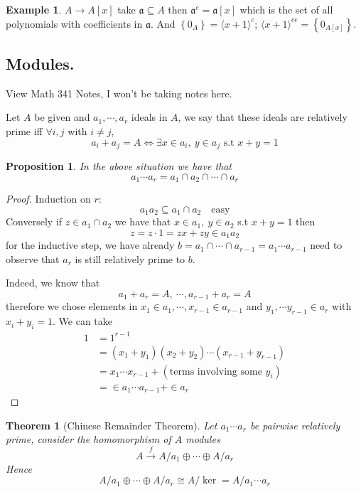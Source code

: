 \documentclass[11pt,a4paper]{article}
\theoremstyle{definition}
\newtheorem{example}[definition]{Example}
\theoremstyle{plain}
\newtheorem{theorem}[definition]{Theorem}
\newtheorem{proposition}[definition]{Proposition}
\theoremstyle{remark}
\renewcommand{\set}[1]{\left\{ #1 \right\}}
\newcommand{\angles}[1]{\langle #1 \rangle}
\begin{document}
\begin{example}
    $A \to A[x]$ take $\mathfrak{a} \subseteq A$ then 
    $\mathfrak{a}^e = \mathfrak{a}[x]$ which is the set of all polynomials with coefficients in $\mathfrak{a}$. And 
    $\set{0_A} = \angles{x + 1}^c$; $\angles{x+1}^{ce} = \set{0_{A[x]}}$. 
\end{example}

\subsection{Modules.}
View Math 341 Notes, I won't be taking notes here. 

Let $A$ be given and $a_1, \cdots, a_r$ ideals in $A$, we say that these ideals are relatively prime iff 
$\forall i, j$ with $i \neq j$, 
$$a_i + a_j = A \iff \exists x \in a_i, \ y \in a_j \text{ s.t } x + y = 1$$ 

\begin{proposition}
    In the above situation we have that 
    $$a_1 \cdots a_r = a_1 \cap a_2 \cap \cdots \cap a_r$$
\end{proposition}

\begin{proof}
    Induction on $r$:
    $$a_1 a_2 \subseteq a_1 \cap a_2 \quad \text{easy}$$
    Conversely if $z \in a_1 \cap a_2$ we have that $x \in a_1, \ y \in a_2$ s.t $x + y = 1$ then 
    $$z = z \cdot 1 = zx + zy \in a_1 a_2$$
    for the inductive step, we have already $b = a_1 \cap \cdots \cap a_{r-1} = a_1 \cdots a_{r-1}$ need to observe that $a_r$ is still 
    relatively prime to $b$. 

    Indeed, we know that 
    $$a_1 + a_r = A, \ \cdots, a_{r-1} + a_r = A$$
    therefore we chose elements in $x_1 \in a_1, \cdots, x_{r-1} \in a_{r-1}$ and 
    $y_1, \cdots y_{r-1}\in a_r$ with $x_i + y_i = 1$. We can take 
    \begin{align*}
        1 &= 1^{r-1}\\ 
        &= (x_1 + y_1) (x_2 + y_2) \cdots (x_{r-1} + y_{r-1})\\
        &= x_1 \cdots x_{r-1} + (\text{terms involving some $y_i$}) \\
        &= \in a_{1} \cdots a_{r-1} + \in a_r 
    \end{align*}
\end{proof}

\begin{theorem}[Chinese Remainder Theorem]
    Let $a_1 \cdots a_r$ be pairwise relatively prime, consider the homomorphism of $A$ modules 
    $$A \xrightarrow{f} A / a_1 \oplus \cdots \oplus A / a_r$$
    Hence 
    $$A / a_1 \oplus \cdots \oplus A / a_r \cong A / \ker = A / a_1 \cdots a_r$$
\end{theorem}
\end{document}
